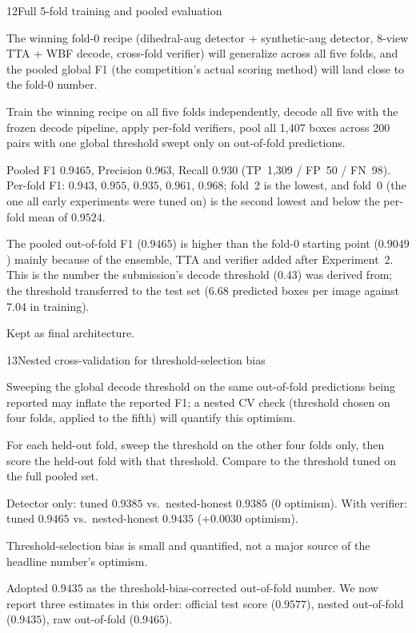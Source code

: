 \begin{explog}{12}{Full 5-fold training and pooled evaluation}
\item[Hypothesis] The winning fold-0 recipe (dihedral-aug detector + synthetic-aug detector, 8-view TTA + WBF decode, cross-fold verifier) will generalize across all five folds, and the pooled global F1 (the competition's actual scoring method) will land close to the fold-0 number.
\item[Method] Train the winning recipe on all five folds independently, decode all five with the frozen decode pipeline, apply per-fold verifiers, pool all 1{,}407 boxes across 200 pairs with one global threshold swept only on out-of-fold predictions.
\item[Result] Pooled F1 $0.9465$, Precision $0.963$, Recall $0.930$ (TP~1{,}309 / FP~50 / FN~98). Per-fold F1: $0.943$, $0.955$, $0.935$, $0.961$, $0.968$; fold~2 is the lowest, and fold~0 (the one all early experiments were tuned on) is the second lowest and below the per-fold mean of $0.9524$.
\item[Inference] The pooled out-of-fold F1 ($0.9465$) is higher than the fold-0 starting point ($0.9049$) mainly because of the ensemble, TTA and verifier added after Experiment~2. This is the number the submission's decode threshold (0.43) was derived from; the threshold transferred to the test set (6.68 predicted boxes per image against 7.04 in training).
\item[Verdict] Kept as final architecture.
\end{explog}


\begin{explog}{13}{Nested cross-validation for threshold-selection bias}
\item[Hypothesis] Sweeping the global decode threshold on the same out-of-fold predictions being reported may inflate the reported F1; a nested CV check (threshold chosen on four folds, applied to the fifth) will quantify this optimism.
\item[Method] For each held-out fold, sweep the threshold on the other four folds only, then score the held-out fold with that threshold. Compare to the threshold tuned on the full pooled set.
\item[Result] Detector only: tuned $0.9385$ vs.\ nested-honest $0.9385$ (0 optimism). With verifier: tuned $0.9465$ vs.\ nested-honest $0.9435$ ($+0.0030$ optimism).
\item[Inference] Threshold-selection bias is small and quantified, not a major source of the headline number's optimism.
\item[Verdict] Adopted $0.9435$ as the threshold-bias-corrected out-of-fold number. We now report three estimates in this order: official test score ($0.9577$), nested out-of-fold ($0.9435$), raw out-of-fold ($0.9465$).
\end{explog}


